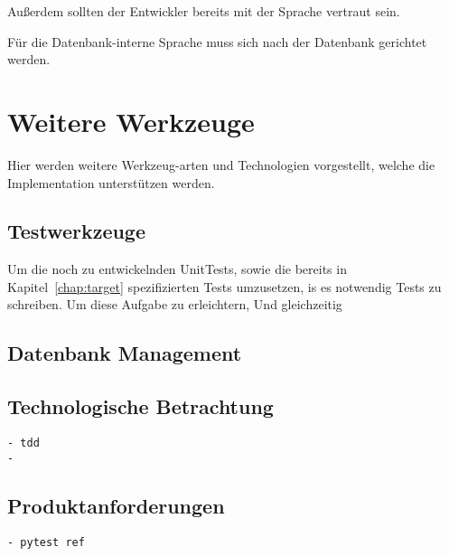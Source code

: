 Außerdem sollten der Entwickler bereits mit der Sprache vertraut sein.

Für die Datenbank-interne Sprache muss sich nach der Datenbank gerichtet werden.


\section{Weitere Werkzeuge}

Hier werden weitere Werkzeug-arten und Technologien vorgestellt,
welche die Implementation unterstützen werden.

\subsection{Testwerkzeuge}

Um die noch zu entwickelnden UnitTests,
sowie die bereits in Kapitel~\ref{chap:target} spezifizierten Tests umzusetzen,
is es notwendig Tests zu schreiben. Um diese Aufgabe zu erleichtern,
Und gleichzeitig 

\subsection{Datenbank Management}

\subsection{Technologische Betrachtung}
\begin{verbatim}
- tdd
- 
\end{verbatim}
\subsection{Produktanforderungen}
\begin{verbatim}
- pytest ref
\end{verbatim}
